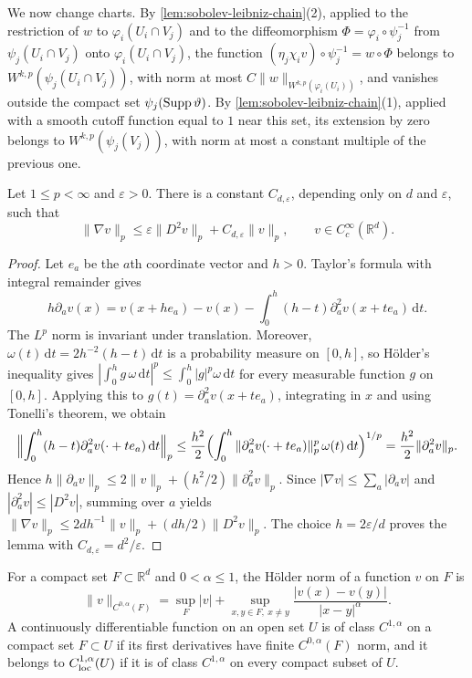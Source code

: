 We now change charts. By \cref{lem:sobolev-leibniz-chain}(2), applied to the restriction of $w$ to $\varphi_i(U_i\cap V_j)$ and to the diffeomorphism $\Phi=\varphi_i\circ\psi_j^{-1}$ from $\psi_j(U_i\cap V_j)$ onto $\varphi_i(U_i\cap V_j)$, the function $(\eta_j\chi_iv)\circ\psi_j^{-1}=w\circ\Phi$ belongs to $W^{k,p}(\psi_j(U_i\cap V_j))$, with norm at most $C\|w\|_{W^{k,p}(\varphi_i(U_i))}$, and vanishes outside the compact set $\psi_j(\operatorname{Supp}\vartheta)$. By \cref{lem:sobolev-leibniz-chain}(1), applied with a smooth cutoff function equal to $1$ near this set, its extension by zero belongs to $W^{k,p}(\psi_j(V_j))$, with norm at most a constant multiple of the previous one.

\begin{lemma}\label{lem:gradient-lp-interpolation}
Let $1\leq p<\infty$ and $\varepsilon>0$. There is a constant $C_{d,\varepsilon}$, depending only on $d$ and $\varepsilon$, such that
\[
 \|\nabla v\|_p\leq\varepsilon\|D^2v\|_p+C_{d,\varepsilon}\|v\|_p,
 \qquad v\in C_c^\infty(\mathbb R^d).
\]
\end{lemma}
\begin{proof}
Let $e_a$ be the $a$th coordinate vector and $h>0$. Taylor's formula with integral remainder gives
\[
 h\partial_av(x)=v(x+he_a)-v(x)
       -\int_0^h(h-t)\partial_a^2v(x+te_a)\,\mathrm d t.
\]
The $L^p$ norm is invariant under translation. Moreover, $\omega(t)\,\mathrm d t=2h^{-2}(h-t)\,\mathrm d t$ is a probability measure on $[0,h]$, so H\"older's inequality gives $|\int_0^hg\,\omega\,\mathrm d t|^p\leq\int_0^h|g|^p\omega\,\mathrm d t$ for every measurable function $g$ on $[0,h]$. Applying this to $g(t)=\partial_a^2v(x+te_a)$, integrating in $x$ and using Tonelli's theorem, we obtain
\[
 \Bigl\|\int_0^h(h-t)\partial_a^2v(\cdot+te_a)\,\mathrm d t\Bigr\|_p\leq\frac{h^2}2\Bigl(\int_0^h\|\partial_a^2v(\cdot+te_a)\|_p^p\,\omega(t)\,\mathrm d t\Bigr)^{1/p}=\frac{h^2}2\|\partial_a^2v\|_p.
\]
Hence $h\|\partial_av\|_p\leq2\|v\|_p+(h^2/2)\|\partial_a^2v\|_p$. Since $|\nabla v|\leq\sum_a|\partial_av|$ and $|\partial_a^2v|\leq|D^2v|$, summing over $a$ yields $\|\nabla v\|_p\leq2dh^{-1}\|v\|_p+(dh/2)\|D^2v\|_p$. The choice $h=2\varepsilon/d$ proves the lemma with $C_{d,\varepsilon}=d^2/\varepsilon$.
\end{proof}

For a compact set $F\subset\mathbb R^d$ and $0<\alpha\leq1$, the H\"older norm of a function $v$ on $F$ is
\[
 \|v\|_{C^{0,\alpha}(F)}=\sup_F|v|+\sup_{x,y\in F,\ x\neq y}\frac{|v(x)-v(y)|}{|x-y|^\alpha}.
\]
A continuously differentiable function on an open set $U$ is of class $C^{1,\alpha}$ on a compact set $F\subset U$ if its first derivatives have finite $C^{0,\alpha}(F)$ norm, and it belongs to $C^{1,\alpha}_{\mathrm{loc}}(U)$ if it is of class $C^{1,\alpha}$ on every compact subset of $U$.

